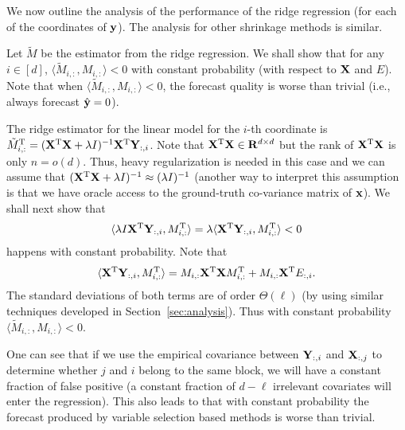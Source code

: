  We now outline the analysis of the performance of the ridge regression (for each of the coordinates of $\mathbf{y}$). The analysis for other shrinkage methods is similar. 

Let $\tilde M$ be the estimator from the ridge regression. 
We shall show that for any $i \in [d]$, $\langle \tilde M_{i, :}, M_{i, :}\rangle < 0$ with constant probability (with respect to $\mathbf{X}$ and $E$). Note that when  $\langle \tilde M_{i, :}, M_{i, :}\rangle < 0$, the forecast quality is worse than trivial (i.e., always forecast $\hat {\mathbf{y}} = 0$). 

The ridge estimator for the linear model for the $i$-th coordinate is $\tilde M^{\mathrm{T}}_{i, :} = (\mathbf{X}^{\mathrm{T}}\mathbf{X} + \lambda I)^{-1}\mathbf{X}^{\mathrm{T}}\mathbf{Y}_{:, i}$. Note that $\mathbf{X}^{\mathrm{T}} \mathbf{X} \in \mathbf{R}^{d \times d}$ but the rank of $\mathbf{X}^{\mathrm{T}}\mathbf{X}$ is only $n = o(d)$. Thus, heavy regularization is needed in this case and we can assume that $(\mathbf{X}^{\mathrm{T}}\mathbf{X}+\lambda I)^{-1} \approx (\lambda I)^{-1}$ (another way to interpret this assumption is that we have oracle access to the ground-truth co-variance matrix of $\mathbf{x}$). We shall next show that 
\begin{equation}
\langle \lambda I \mathbf{X}^{\mathrm{T}}\mathbf{Y}_{:, i}, M^{\mathrm{T}}_{i, :} \rangle = 
\lambda \langle  \mathbf{X}^{\mathrm{T}}\mathbf{Y}_{:, i}, M^{\mathrm{T}}_{i, :} \rangle < 0
\end{equation}
happens with constant probability. Note that 
\begin{equation}
    \langle  \mathbf{X}^{\mathrm{T}}\mathbf{Y}_{:, i}, M^{\mathrm{T}}_{i, :} \rangle = M_{i, :} \mathbf{X}^{\mathrm{T}}\mathbf{X} M^{\mathrm{T}}_{i, :} + M_{i, :}\mathbf{X}^{\mathrm{T}} E_{:, i}.  
\end{equation}
The standard deviations of both terms are of order $\Theta(\ell)$ (by using similar techniques developed in Section~\ref{sec:analysis}). Thus with constant probability $\langle \tilde M_{i, :}, M_{i, :}\rangle < 0$. 

 One can see that if we use the empirical covariance between $\mathbf{Y}_{:, i}$ and $\mathbf{X}_{:, j}$ to determine whether $j$ and $i$ belong to the same block, we will have a constant fraction of false positive (a constant fraction of $d - \ell$ irrelevant covariates will enter the regression). This also leads to that with constant probability the forecast produced by variable selection based methods is worse than trivial. 
\fi

